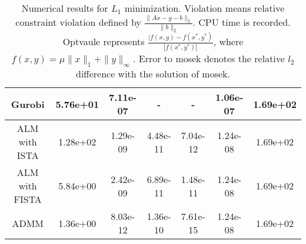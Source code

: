 \documentclass{article}
\begin{document}
\begin{table}[H]
\begin{tabular}{|c|c|c|c|c|c|c|}
Gurobi & 5.76e+01 & 7.11e-07 & - & - & 1.06e-07 & 1.69e+02\\\hline
ALM with ISTA & 1.28e+02 & 1.29e-09 & 4.48e-11 & 7.04e-12 &1.24e-08 & 1.69e+02 \\\hline
ALM with FISTA & 5.84e+00 & 2.42e-09 & 6.89e-11 & 1.48e-11 &1.24e-08 & 1.69e+02 \\\hline
ADMM & 1.36e+00 & 8.03e-12 & 1.36e-10 & 7.61e-15&1.24e-08 & 1.69e+02  \\\hline
\end{tabular}
\caption{Numerical results for $L_1$ minimization. Violation means relative constraint violation defined by $\frac{\|Ax-y-b\|_2}{\|b\|_2}$. CPU time is recorded. Optvaule represents $\frac{|f(x,y)-f(x^*,y^*)}{|f(x^*,y^*)|}$, where $f(x,y)=\mu\|x\|_1+\|y\|_\infty$. Error to mosek denotes the relative $l_2$ difference with the solution of mosek.\label{table1}}
\end{table}
  

\end{document}
